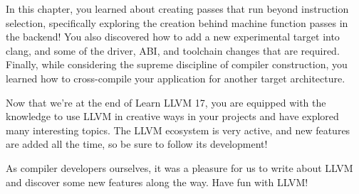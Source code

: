 In this chapter, you learned about creating passes that run beyond instruction selection, specifically exploring the creation behind machine function passes in the backend! You also discovered how to add a new experimental target into clang, and some of the driver, ABI, and toolchain changes that are required. Finally, while considering the supreme discipline of compiler construction, you learned how to cross-compile your application for another target architecture.

Now that we’re at the end of Learn LLVM 17, you are equipped with the knowledge to use LLVM in creative ways in your projects and have explored many interesting topics. The LLVM ecosystem is very active, and new features are added all the time, so be sure to follow its development!

As compiler developers ourselves, it was a pleasure for us to write about LLVM and discover some new features along the way. Have fun with LLVM!